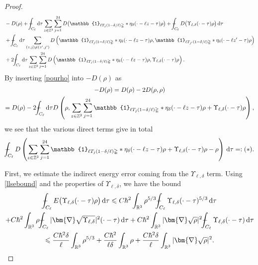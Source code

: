 \documentclass[final,onefignum,onetabnum,reqno]{amsart}
\theoremstyle{remark}
\renewcommand{\le}{\leqslant}
\newcommand{\RR}{\mathbb{R}}
\newcommand{\ZZ}{\mathbb{Z}}
\newcommand{\iden}{\mathbb{1}} %
\newcommand{\grad}{\bm{\nabla}} %
\newcommand{\tetra}{\mathbb{\Delta}} %
\newcommand{\dd}{\mathrm{d}} %
\def\Xint#1{\mathchoice
{\XXint\displaystyle\textstyle{#1}}%
{\XXint\textstyle\scriptstyle{#1}}%
{\XXint\scriptstyle\scriptscriptstyle{#1}}%
{\XXint\scriptscriptstyle\scriptscriptstyle{#1}}%
\!\int}
\def\XXint#1#2#3{{\setbox0=\hbox{$#1{#2#3}{\int}$ }
\vcenter{\hbox{$#2#3$ }}\kern-.6\wd0}}
\def\dashint{\Xint-}
\begin{document}
\begin{proof}
\begin{align*}
&-D(\rho)+\dashint_{C_{\ell}}\dd\tau \sum_{z\in\ZZ^3} \sum_{j=1}^{24} D\bigl(\iden_{\ell T_j(1-\delta/\ell)\tetra} * \eta_\delta(\cdot - \ell z - \tau)\rho\bigr) + \dashint_{C_{\ell}} D\bigl(\Upsilon_{\ell,\delta}(\cdot - \tau)\rho\bigr)\, \dd\tau\\
&+ \dashint_{C_{\ell}} \dd\tau \sum_{(z,j)\neq(z',j')}  D\left(\iden_{\ell T_j(1-\delta/\ell)\tetra} * \eta_\delta(\cdot - \ell z - \tau)\rho, \iden_{\ell T_{j'}(1-\delta/\ell)\tetra} * \eta_\delta(\cdot - \ell z' - \tau)\rho\right)\\
&+ 2\dashint_{C_{\ell}} \dd\tau \sum_{z\in\ZZ^3} 
\sum_{j=1}^{24} D\left(\iden_{\ell T_j(1-\delta/\ell)\tetra} * \eta_\delta(\cdot - \ell z - \tau)\rho, \Upsilon_{\ell,\delta}(\cdot-\tau)\rho\right).
\end{align*}
By inserting \cref{pourho} into $-D(\rho)$ as
\begin{multline*}
-D(\rho)=D(\rho)-2D(\rho,\rho)\\
=D(\rho)-2\dashint_{C_\ell}\dd\tau D\left(\rho,\sum_{z\in\ZZ^3} \sum_{j=1}^{24} \iden_{\ell T_j(1-\delta/\ell)\tetra} * \eta_\delta(\cdot - \ell z - \tau)\rho + \Upsilon_{\ell,\delta}(\cdot-\tau)\rho\right),
\end{multline*}
we see that the various direct terms give in total
$$
\dashint_{C_\ell} D\left(  \sum_{z\in\ZZ^3} \sum_{j=1}^{24} \iden_{\ell T_j(1-\delta/\ell)\tetra} * \eta_\delta(\cdot - \ell z - \tau)\rho + \Upsilon_{\ell,\delta}(\cdot-\tau)\rho -\rho\right)\,\dd\tau=:(*).
$$

First, we estimate the indirect energy error coming from the $\Upsilon_{\ell,\delta}$ term. Using \cref{llsebound} and the properties of $\Upsilon_{\ell,\delta}$, we have the bound
\begin{multline*}
\dashint_{C_\ell} E\bigl(\Upsilon_{\ell,\delta}(\cdot-\tau)\rho\bigr)\,\dd\tau \le C\hbar^2 \int_{\RR^3} \rho^{5/3} \dashint_{C_\ell}\Upsilon_{\ell,\delta}(\cdot-\tau)^{5/3}\,\dd\tau  \\
+C\hbar^2 \int_{\RR^3} \rho \dashint_{C_\ell}  |\grad\sqrt{\Upsilon_{\ell,\delta}}|^2 (\cdot-\tau)\,\dd\tau  + C\hbar^2\int_{\RR^3} |\grad\sqrt{\rho}|^2 \dashint_{C_\ell} \Upsilon_{\ell,\delta}(\cdot-\tau)\,\dd\tau\\
\le \frac{C\hbar^2\delta}{\ell} \int_{\RR^3}\rho^{5/3} +  \frac{C\hbar^2}{\ell\delta} \int_{\RR^3} \rho + \frac{C\hbar^2\delta}{\ell}\int_{\RR^3} |\grad\sqrt{\rho}|^2.
\end{multline*}


\end{proof}
\end{document}

